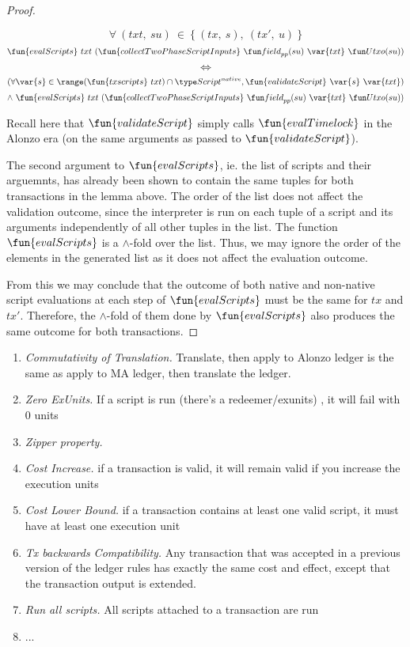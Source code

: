 \begin{property}
\begin{proof}
\begin{itemize}
      \[ \forall ~(txt,~ su)~ \in~ \{~(tx,~ s),~(tx',~ u)~\} \]
      \[\fun{evalScripts}~{txt}~ (\fun{collectTwoPhaseScriptInputs} ~\field_{pp}(su)~\var{txt}~ \Utxo(su)) \]
      \[~ \Leftrightarrow ~ \]
      \[(\forall \var{s} \in \range (\fun{txscripts}~{txt}) \cap \ScriptNative,
      \fun{validateScript}~\var{s}~\var{txt}) \]
      \[ \wedge ~\fun{evalScripts}~{txt}~ (\fun{collectTwoPhaseScriptInputs} ~\field_{pp}(su)~\var{txt}~ \Utxo(su)) \]

      Recall here that $\fun{validateScript}$ simply calls $\fun{evalTimelock}$ in the
      Alonzo era (on the same arguments as passed to $\fun{validateScript}$).
    \end{itemize}

    The second argument to $\fun{evalScripts}$, ie. the list of scripts and their arguemnts,
    has already been shown to contain the same tuples for both transactions in the lemma above.
    The order of the list does not affect the validation outcome, since the interpreter is run
    on each tuple of a script and its arguments independently of all other tuples in the list.
    The function $\fun{evalScripts}$ is a $\wedge$-fold over the list. Thus, we may ignore the order
    of the elements in the generated list as it does not affect the evaluation outcome.

    From this we may conclude that the outcome of both native and non-native script evaluations
    at each step of $\fun{evalScripts}$ must be the same for $tx$ and $tx'$. Therefore,
    the $\wedge$-fold of them done by $\fun{evalScripts}$ also produces the same outcome
    for both transactions.

\end{proof}
\end{property}


\begin{enumerate}
\item
  \emph{Commutativity of Translation.} Translate, then apply to Alonzo ledger is
  the same as apply to MA ledger, then translate the ledger.
\item
  \emph{Zero ExUnits.} If a script is run (there’s a redeemer/exunits) , it will fail with 0 units
\item
  \emph{Zipper property.}
\item
  \emph{Cost Increase.} if a transaction is valid, it will remain valid if you increase the execution units
\item
  \emph{Cost Lower Bound.} if a transaction contains at least one valid script, it must have at least one execution unit
\item
  \emph{Tx backwards Compatibility.} Any transaction that was accepted in a previous version of the ledger rules
    has exactly the same cost and effect, except that the transaction output is extended.
\item \emph{Run all scripts.} All scripts attached to a transaction are run
\item
  ... 
\end{enumerate}
